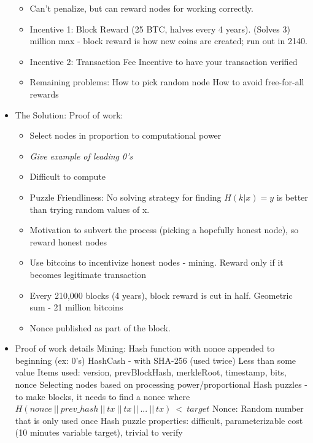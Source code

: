 \documentclass{article}
\begin{document}
\begin{itemize}
    \begin{itemize}
      \item Can't penalize, but can reward nodes for working correctly.
      \item Incentive 1: Block Reward (25 BTC, halves every 4 years). (Solves 3)
         million max - block reward is how new coins are created; run out in 2140.
      \item Incentive 2: Transaction Fee
        \subitem Incentive to have your transaction verified
      \item Remaining problems: 
        \subitem How to pick random node
        \subitem How to avoid free-for-all rewards
    \end{itemize}
  \item The Solution: Proof of work:
    \begin{itemize}
      \item Select nodes in proportion to computational power
      \item \emph{Give example of leading 0's}
      \item Difficult to compute
      \item Puzzle Friendliness: No solving strategy for finding $H(k | x)=y$ is better than trying random values of x.
      \item Motivation to subvert the process (picking a hopefully honest node), so reward honest nodes
      \item Use bitcoins to incentivize honest nodes - mining. Reward only if it becomes legitimate transaction
      \item Every 210,000 blocks (4 years), block reward is cut in half. Geometric sum - 21 million bitcoins
      \item Nonce published as part of the block.
    \end{itemize}
  \item Proof of work details
    \subitem Mining: Hash function with nonce appended to beginning (ex: 0's)
    \subitem HashCash - with SHA-256 (used twice)
    \subitem Less than some value
    \subitem Items used: version, prevBlockHash, merkleRoot, timestamp, bits, nonce
    \subitem Selecting nodes based on processing power/proportional
    \subitem Hash puzzles - to make blocks, it needs to find a nonce where
    \subitem $ H(nonce\ ||\ prev\_hash\ ||\ tx\ ||\ tx\ ||\ ...\ ||\ tx)\ <\ target $
    \subitem Nonce: Random number that is only used once
    \subitem Hash puzzle properties: difficult, parameterizable cost (10 minutes variable target), trivial to verify

\end{itemize}
\end{document}
